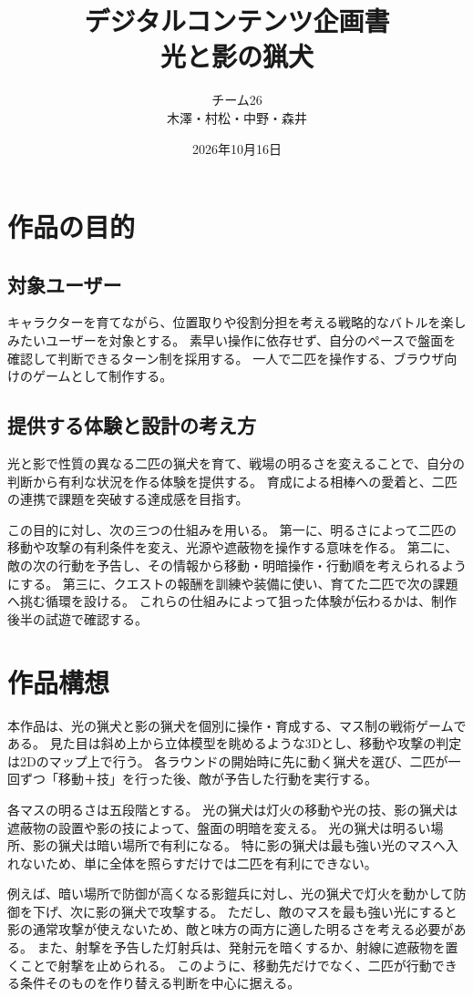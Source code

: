 \documentclass[a4paper,11pt,dvipdfmx]{jsarticle}
\title{デジタルコンテンツ企画書\\\large 光と影の猟犬}
\author{チーム26\\木澤・村松・中野・森井}
\date{2026年10月16日}
\begin{document}
\maketitle

\section{作品の目的}
\subsection{対象ユーザー}
キャラクターを育てながら、位置取りや役割分担を考える戦略的なバトルを楽しみたいユーザーを対象とする。
素早い操作に依存せず、自分のペースで盤面を確認して判断できるターン制を採用する。
一人で二匹を操作する、ブラウザ向けのゲームとして制作する。

\subsection{提供する体験と設計の考え方}
光と影で性質の異なる二匹の猟犬を育て、戦場の明るさを変えることで、自分の判断から有利な状況を作る体験を提供する。
育成による相棒への愛着と、二匹の連携で課題を突破する達成感を目指す。

この目的に対し、次の三つの仕組みを用いる。
第一に、明るさによって二匹の移動や攻撃の有利条件を変え、光源や遮蔽物を操作する意味を作る。
第二に、敵の次の行動を予告し、その情報から移動・明暗操作・行動順を考えられるようにする。
第三に、クエストの報酬を訓練や装備に使い、育てた二匹で次の課題へ挑む循環を設ける。
これらの仕組みによって狙った体験が伝わるかは、制作後半の試遊で確認する。

\section{作品構想}
本作品は、光の猟犬と影の猟犬を個別に操作・育成する、マス制の戦術ゲームである。
見た目は斜め上から立体模型を眺めるような3Dとし、移動や攻撃の判定は2Dのマップ上で行う。
各ラウンドの開始時に先に動く猟犬を選び、二匹が一回ずつ「移動＋技」を行った後、敵が予告した行動を実行する。

各マスの明るさは五段階とする。
光の猟犬は灯火の移動や光の技、影の猟犬は遮蔽物の設置や影の技によって、盤面の明暗を変える。
光の猟犬は明るい場所、影の猟犬は暗い場所で有利になる。
特に影の猟犬は最も強い光のマスへ入れないため、単に全体を照らすだけでは二匹を有利にできない。

例えば、暗い場所で防御が高くなる影鎧兵に対し、光の猟犬で灯火を動かして防御を下げ、次に影の猟犬で攻撃する。
ただし、敵のマスを最も強い光にすると影の通常攻撃が使えないため、敵と味方の両方に適した明るさを考える必要がある。
また、射撃を予告した灯射兵は、発射元を暗くするか、射線に遮蔽物を置くことで射撃を止められる。
このように、移動先だけでなく、二匹が行動できる条件そのものを作り替える判断を中心に据える。
\end{document}
